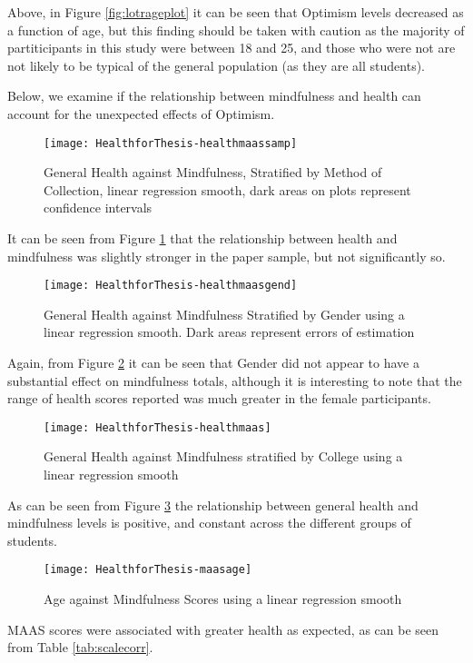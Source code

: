 \documentclass{article}
\begin{document}
Above, in Figure \ref{fig:lotrageplot} it can be seen that Optimism levels decreased as a function of age, but this finding should be taken with caution as the majority of partiticipants in this study were between 18 and 25, and those who were not are not likely to be typical of the general population (as they are all students).

Below, we examine if the relationship between mindfulness and health can account for the unexpected effects of Optimism.
\begin{figure}
\texttt{[image: HealthforThesis-healthmaassamp]}
  \caption{General Health against Mindfulness, Stratified by Method of Collection, linear regression smooth, dark areas on plots represent confidence intervals}
  \label{fig:healthmaasmethplot}
\end{figure}


It can be seen from Figure \ref{fig:healthmaasmethplot} that the relationship between health and mindfulness was slightly stronger in the paper sample, but not significantly so.
\begin{figure}
\texttt{[image: HealthforThesis-healthmaasgend]}
  \caption{General Health against Mindfulness Stratified by Gender using a linear regression smooth. Dark areas represent errors of estimation}
  \label{fig:healthmaasgend}
\end{figure}


Again, from Figure \ref{fig:healthmaasgend} it can be seen that Gender did not appear to have a substantial effect on mindfulness totals, although it is interesting to note that the range of health scores reported was much greater in the female participants.
\begin{figure}
\texttt{[image: HealthforThesis-healthmaas]}
  \caption{General Health against Mindfulness stratified by College using a linear regression smooth}
  \label{fig:healthmaascoll}
\end{figure}


As can be seen from Figure \ref{fig:healthmaascoll} the relationship between general health and mindfulness levels is positive, and constant across the different groups of students.

\begin{figure}
\texttt{[image: HealthforThesis-maasage]}
  \caption{Age against Mindfulness Scores using a linear regression smooth}
  \label{fig:maasage}
\end{figure}


MAAS scores were associated with greater health as expected, as can be seen from Table \ref{tab:scalecorr}.
\end{document}
